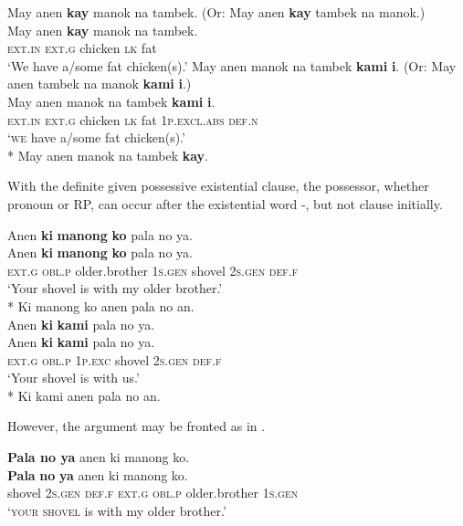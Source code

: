 \largerpage
\ea
\label{ex:wehavesomefatchickens}
May anen \textbf{kay} manok na tambek. (Or: May anen \textbf{kay} tambek na manok.) \\\smallskip \gll May anen \textbf{kay} manok na tambek. \\
\textsc{ext.in} \textsc{ext.g} chicken  \textsc{lk} fat \\
\glt ‘We have a/some fat chicken(s).’
\z
\ea
\label{ex:WEhavesomefatchickens}
May anen manok na tambek \textbf{kami} \textbf{i}. (Or: May anen tambek na manok \textbf{kami} \textbf{i}.) \\\smallskip \gll May anen manok na tambek \textbf{kami} \textbf{i}. \\
\textsc{ext.in} \textsc{ext.g} chicken  \textsc{lk} fat 1\textsc{p.excl.abs} \textsc{def.n} \\
\glt `\textsc{we} have a/some fat chicken(s).' \\\smallskip
*{ }May anen manok na tambek \textbf{kay}. \\
\z

With the definite given possessive existential clause, the possessor, whether pronoun or RP, can occur after the existential word -, but not clause initially.

\ea
\label{ex:shovel-1}
Anen  \textbf{ki}  \textbf{manong}  \textbf{ko}  pala  no  ya.  \\\smallskip \gll Anen  \textbf{ki}  \textbf{manong}  \textbf{ko}  pala  no  ya.  \\
\textsc{ext.g}  \textsc{obl.p}  older.brother  1\textsc{s.gen}  shovel  2\textsc{s.gen}  \textsc{def.f} \\
\glt ‘Your shovel is with my older brother\textsc{.’} \\\smallskip
*{ }Ki manong ko anen pala no an. \\
\z
\ea
\label{ex:shovel-2}
Anen  \textbf{ki}  \textbf{kami}  pala  no  ya.  \\\smallskip \gll Anen  \textbf{ki}  \textbf{kami}  pala  no  ya.  \\
\textsc{ext.g}  \textsc{obl.p}  1\textsc{p.exc}  shovel  2\textsc{s.gen}  \textsc{def.f} \\
\glt ‘Your shovel is with us.’ \\\smallskip
*{ }Ki kami anen pala no an.
\z

However, the argument may be fronted as in .

\ea
\label{ex:shovel-3}
\textbf{Pala no ya}  anen  ki manong ko. \\\smallskip
\gll \textbf{Pala} \textbf{no} \textbf{ya}  anen  ki manong ko. \\
shovel 2\textsc{s.gen}  \textsc{def.f} \textsc{ext.g}  \textsc{obl.p}  older.brother  1\textsc{s.gen} \\
\glt `\textsc{your shovel} is with my older brother.'
\z

